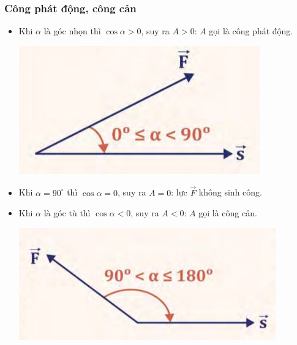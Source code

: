 	\subsubsection{Công phát động, công cản}
	\begin{itemize}
		\item Khi $\alpha$ là góc nhọn thì $\cos \alpha >0$, suy ra $A>0$: $A$ gọi là công phát động.
		\begin{center}
			\includegraphics[scale=0.5]{../figs/VN10-PH-30-L-022-1-4.JPG}
		\end{center}
		\item Khi $\alpha = 90^\circ$ thì $\cos 
		\alpha = 0$, suy ra $A=0$: lực $\vec{F}$ không sinh công.
		\item Khi $\alpha$ là góc tù thì $\cos \alpha <0$, suy ra $A<0$: $A$ gọi là công cản.
		\begin{center}
			\includegraphics[scale=0.55]{../figs/VN10-PH-30-L-022-1-5.JPG}
		\end{center}
	\end{itemize}
	
	
